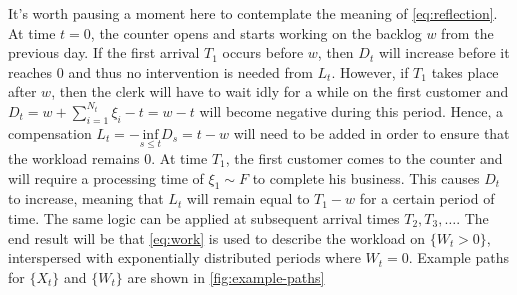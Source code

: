 \documentclass[titlepage]{article}
\theoremstyle{plain}
\theoremstyle{definition}
\begin{document}
It's worth pausing a moment here to contemplate the meaning of \cref{eq:reflection}. At time $t = 0$, the counter opens and starts working on the backlog $w$ from the previous day. If the first arrival $T_1$ occurs before $w$, then $D_t$ will increase before it reaches $0$ and thus no intervention is needed from $L_t$. However, if $T_1$ takes place after $w$, then the clerk will have to wait idly for a while on the first customer and $D_t = w + \sum_{i = 1}^{N_t} \xi_i - t = w - t$ will become negative during this period. Hence, a compensation $L_t = -\underset{s \leq t}{\mathrm{inf}} D_s = t - w$ will need to be added in order to ensure that the workload remains $0$. At time $T_1$, the first customer comes to the counter and will require a processing time of $\xi_1 \sim F$ to complete his business. This causes $D_t$ to increase, meaning that $L_t$ will remain equal to $T_1 - w$ for a certain period of time. The same logic can be applied at subsequent arrival times $T_2, T_3, \dots$. The end result will be that \cref{eq:work} is used to describe the workload on $\{ W_t > 0 \}$, interspersed with exponentially distributed periods where $W_t = 0$. Example paths for $\{ X_t \}$ and $\{ W_t \}$ are shown in \cref{fig:example-paths}
\end{document}
